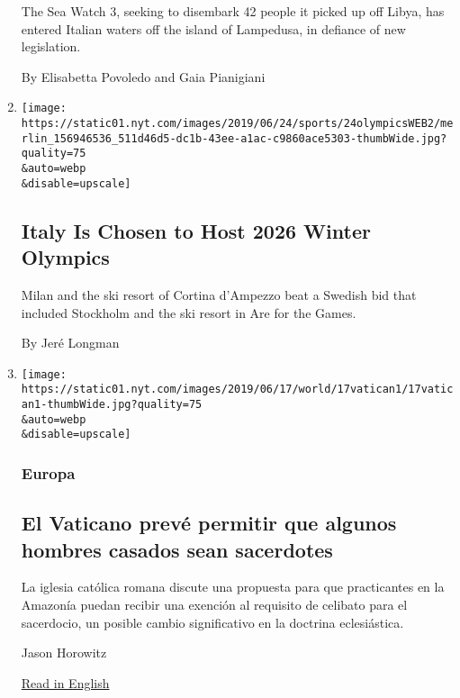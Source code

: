 \begin{enumerate}
  The Sea Watch 3, seeking to disembark 42 people it picked up off
  Libya, has entered Italian waters off the island of Lampedusa, in
  defiance of new legislation.

  By Elisabetta Povoledo and Gaia Pianigiani
\item
  \href{/2019/06/24/sports/olympics/italy-2026-winter-olympics.html}{}

  \texttt{[image: https://static01.nyt.com/images/2019/06/24/sports/24olympicsWEB2/merlin\_156946536\_511d46d5-dc1b-43ee-a1ac-c9860ace5303-thumbWide.jpg?quality=75\\\&auto=webp\\\&disable=upscale]}

  \hypertarget{italy-is-chosen-to-host-2026-winter-olympics}{%
  \subsection{Italy Is Chosen to Host 2026 Winter
  Olympics}\label{italy-is-chosen-to-host-2026-winter-olympics}}

  Milan and the ski resort of Cortina d'Ampezzo beat a Swedish bid that
  included Stockholm and the ski resort in Are for the Games.

  By Jeré Longman
\item
  \href{/es/2019/06/17/espanol/vaticano-sacerdotes-casados.html}{}

  \texttt{[image: https://static01.nyt.com/images/2019/06/17/world/17vatican1/17vatican1-thumbWide.jpg?quality=75\\\&auto=webp\\\&disable=upscale]}

  \hypertarget{europa}{%
  \subsubsection{Europa}\label{europa}}

  \hypertarget{el-vaticano-prevuxe9-permitir-que-algunos-hombres-casados-sean-sacerdotes}{%
  \subsection{El Vaticano prevé permitir que algunos hombres casados
  sean
  sacerdotes}\label{el-vaticano-prevuxe9-permitir-que-algunos-hombres-casados-sean-sacerdotes}}

  La iglesia católica romana discute una propuesta para que practicantes
  en la Amazonía puedan recibir una exención al requisito de celibato
  para el sacerdocio, un posible cambio significativo en la doctrina
  eclesiástica.

  Jason Horowitz

  \href{https://www.nytimes.com/2019/06/17/world/europe/vatican-priests-married-men.html}{Read
  in English}
\end{enumerate}

